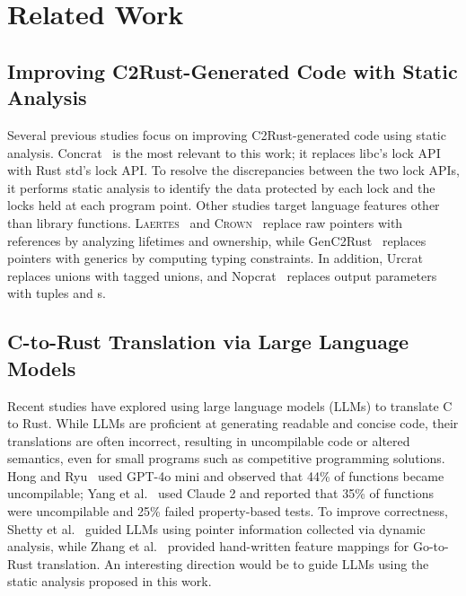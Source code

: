 \section{Related Work}
\label{sec:related}

\subsection{Improving C2Rust-Generated Code with Static Analysis}

Several previous studies focus on improving C2Rust-generated code using static
analysis.
%
Concrat~\cite{hong2023concrat} is the most relevant to this work;
%
it replaces libc's lock API with Rust std's lock API.
%
To resolve the discrepancies between the two lock APIs, it performs static
analysis to identify the data protected by each lock and the locks held at each
program point.
%
Other studies target language features other than library functions.
%
\textsc{Laertes}~\cite{emre2021translating, emre2023aliasing} and
\textsc{Crown}~\cite{zhang2023ownership} replace raw pointers with references by
analyzing lifetimes and ownership, while GenC2Rust~\cite{wu2025genc2rust}
replaces  pointers with generics by computing typing constraints.
%
In addition, Urcrat~\cite{hong2024tag} replaces unions with tagged unions, and
Nopcrat~\cite{hong2024dont} replaces output parameters with tuples and
s.

\subsection{C-to-Rust Translation via Large Language Models}

Recent studies have explored using large language models (LLMs) to translate C
to Rust.
%
While LLMs are proficient at generating readable and concise code, their
translations are often incorrect, resulting in uncompilable code or altered
semantics, even for small programs such as competitive programming solutions.
%
Hong and Ryu~\cite{hong2024type} used GPT-4o mini and observed that 44\% of
functions became uncompilable;
%
%
Yang et al.~\cite{yang2024vert} used Claude 2 and reported that 35\% of
functions were uncompilable and 25\% failed property-based tests.
%
To improve correctness, Shetty et al.~\cite{shetty2024syzygy} guided LLMs using
pointer information collected via dynamic analysis, while Zhang et
al.~\cite{zhang2024scalable} provided hand-written feature mappings for
Go-to-Rust translation.
%
An interesting direction would be to guide LLMs using the static analysis
proposed in this work.

